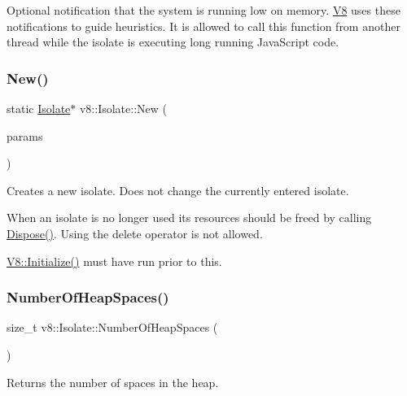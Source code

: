 Optional notification that the system is running low on memory. \mbox{\hyperlink{classv8_1_1V8}{V8}} uses these notifications to guide heuristics. It is allowed to call this function from another thread while the isolate is executing long running Java\+Script code. \mbox{\label{classv8_1_1Isolate_ab6accf94a5a897fcc1220ab2c049e502}} 
\subsubsection{\texorpdfstring{New()}{New()}}
{\footnotesize\ttfamily static \mbox{\hyperlink{classv8_1_1Isolate}{Isolate}}$\ast$ v8\+::\+Isolate\+::\+New (\begin{DoxyParamCaption}\item[{const \mbox{\hyperlink{structv8_1_1Isolate_1_1CreateParams}{Create\+Params}} \&}]{params }\end{DoxyParamCaption})\hspace{0.3cm}{\ttfamily [static]}}

Creates a new isolate. Does not change the currently entered isolate.

When an isolate is no longer used its resources should be freed by calling \mbox{\hyperlink{classv8_1_1Isolate_a1a5a5762e4221aff8c6b10f9e3cec0af}{Dispose()}}. Using the delete operator is not allowed.

\mbox{\hyperlink{classv8_1_1V8_a40daec93ce44bdd922567fc121be9db8}{V8\+::\+Initialize()}} must have run prior to this. \mbox{\label{classv8_1_1Isolate_ad948acf0892e677a95fbc743b63ca5fa}} 
\subsubsection{\texorpdfstring{Number\+Of\+Heap\+Spaces()}{NumberOfHeapSpaces()}}
{\footnotesize\ttfamily size\+\_\+t v8\+::\+Isolate\+::\+Number\+Of\+Heap\+Spaces (\begin{DoxyParamCaption}{ }\end{DoxyParamCaption})}

Returns the number of spaces in the heap. \mbox{\label{classv8_1_1Isolate_aa7df97ed0ea96925e60f519ffc09a33a}} 
